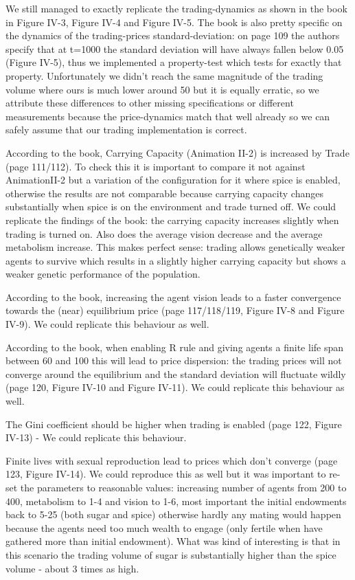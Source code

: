 We still managed to exactly replicate the trading-dynamics as shown in the book in Figure IV-3, Figure IV-4 and Figure IV-5. The book is also pretty specific on the dynamics of the trading-prices standard-deviation: on page 109 the authors specify that at t=1000 the standard deviation will have always fallen below 0.05 (Figure IV-5), thus we implemented a property-test which tests for exactly that property. Unfortunately we didn't reach the same magnitude of the trading volume where ours is much lower around 50 but it is equally erratic, so we attribute these differences to other missing specifications or different measurements because the price-dynamics match that well already so we can safely assume that our trading implementation is correct.

According to the book, Carrying Capacity (Animation II-2) is increased by Trade (page 111/112). To check this it is important to compare it not against AnimationII-2 but a variation of the configuration for it where spice is enabled, otherwise the results are not comparable because carrying capacity changes substantially when spice is on the environment and trade turned off. We could replicate the findings of the book: the carrying capacity increases slightly when trading is turned on. Also does the average vision decrease and the average metabolism increase. This makes perfect sense: trading allows genetically weaker agents to survive which results in a slightly higher carrying capacity but shows a weaker genetic performance of the population.

According to the book, increasing the agent vision leads to a faster convergence towards the (near) equilibrium price (page 117/118/119, Figure IV-8 and Figure IV-9). We could replicate this behaviour as well.

According to the book, when enabling R rule and giving agents a finite life span between 60 and 100 this will lead to price dispersion: the trading prices will not converge around the equilibrium and the standard deviation will fluctuate wildly (page 120, Figure IV-10 and Figure IV-11). We could replicate this behaviour as well.

The Gini coefficient should be higher when trading is enabled (page 122, Figure IV-13) - We could replicate this behaviour.

Finite lives with sexual reproduction lead to prices which don't converge (page 123, Figure IV-14). We could reproduce this as well but it was important to re-set the parameters to reasonable values: increasing number of agents from 200 to 400, metabolism to 1-4 and vision to 1-6, most important the initial endowments back to 5-25 (both sugar and spice) otherwise hardly any mating would happen because the agents need too much wealth to engage (only fertile when have gathered more than initial endowment). What was kind of interesting is that in this scenario the trading volume of sugar is substantially higher than the spice volume - about 3 times as high. 

